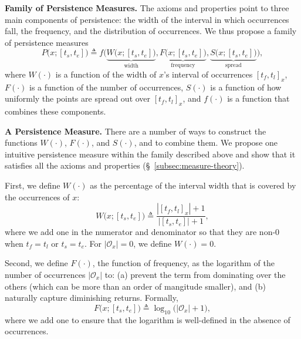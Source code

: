 \documentclass[sigconf]{acmart}
\newcommand{\pattern}{x}
\newcommand{\x}{x}
\newcommand{\intervalStart}{t_s}
\newcommand{\intervalEnd}{t_e}
\newcommand{\interval}{[\intervalStart, \intervalEnd]}
\newcommand{\intervalWidth}{|\interval|}
\newcommand{\occs}{\mathcal{O}}
\newcommand{\firstOcc}{t_f}
\newcommand{\lastOcc}{t_l}
\newcommand{\occInterval}{[\firstOcc,\lastOcc]}
\newcommand{\occIntervalWidth}{|\occInterval_\x|}
\newcommand{\freq}{F}
\newcommand{\freqLong}{\freq\big(x;\interval\big)}
\newcommand{\width}{W}
\newcommand{\widthLong}{\width\big(\pattern; \interval\big)}
\newcommand{\spread}{S}
\newcommand{\spreadLong}{\spread\big(\pattern; \interval\big)}
\newcommand{\persistence}{P}
\begin{document}
\noindent \textbf{Family of Persistence Measures.} The axioms and properties point to three main components of persistence: the width of the interval in which occurrences fall, the frequency, and the distribution of occurrences. We thus propose a family of persistence measures
\begin{equation}
    \label{eq:persistence-form}
    \persistence\big(\pattern;\interval\big) \triangleq f\Big( \underbrace{\widthLong}_{\text{width}}, \underbrace{\freqLong}_{\text{frequency}}, \underbrace{\spreadLong}_{\text{spread}} \Big),
\end{equation}
\noindent where $\width(\cdot)$ is a function of the width of $\x$'s interval of occurrences $\occInterval_\x$, 
$\freq(\cdot)$ is a function of the number of occurrences, 
$\spread(\cdot)$ is a function of how uniformly the points are spread out over $\occInterval_\x$, and
$f(\cdot)$ is a function that combines these components. 

\vspace{0.1cm}
\noindent \textbf{A Persistence Measure.} There are a number of ways to construct the functions $\width(\cdot)$, $\freq(\cdot)$, and $\spread(\cdot)$, and to combine them. We propose one intuitive persistence measure within the family described above and show that it satisfies all the axioms and properties (\S~\ref{subsec:measure-theory}).

First, we define $\width(\cdot)$ as the percentage of the interval width that is covered by the occurrences of $x$:
\begin{equation}
    \label{eq:width}
    \width\big(\pattern; \interval\big) \triangleq \frac{\occIntervalWidth + 1}{\intervalWidth + 1},
\end{equation}
where we add one in the numerator and denominator so that they are non-0 when $\firstOcc = \lastOcc$ or $\intervalStart = \intervalEnd$.
For $|\occs_\x|=0$, we define $W(\cdot)=0$.

Second, we define $\freq(\cdot)$, the function of frequency, as the logarithm of the number of occurrences $|\occs_\x|$ to: (a) prevent the term from dominating over the others (which can be more than an order of mangitude smaller), 
and (b) naturally capture diminishing returns. Formally, 
\begin{equation}
    \label{eq:freq}
    \freqLong \triangleq \log_{10}\Big(|\occs_\x| + 1\Big),
\end{equation}
where we add one to ensure that the logarithm is well-defined in the absence of occurrences.
\end{document}
